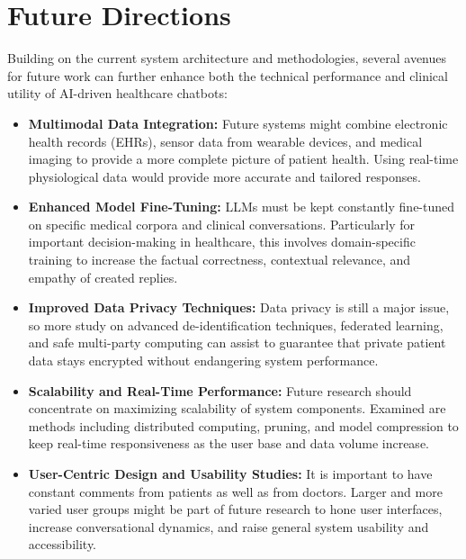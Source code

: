 \section{Future Directions}
\label{sec:future_directions}

Building on the current system architecture and methodologies, several avenues for future work can further enhance both the technical performance and clinical utility of AI-driven healthcare chatbots:

\begin{itemize}[itemsep=2em]
    \item \textbf{Multimodal Data Integration:}  
          Future systems might combine electronic health records (EHRs), sensor data from wearable devices, and medical imaging to provide a more complete picture of patient health. Using real-time physiological data would provide more accurate and tailored responses.
          
    \item \textbf{Enhanced Model Fine-Tuning:}  
          LLMs must be kept constantly fine-tuned on specific medical corpora and clinical conversations. Particularly for important decision-making in healthcare, this involves domain-specific training to increase the factual correctness, contextual relevance, and empathy of created replies.
          
    \item \textbf{Improved Data Privacy Techniques:}  
          Data privacy is still a major issue, so more study on advanced de-identification techniques, federated learning, and safe multi-party computing can assist to guarantee that private patient data stays encrypted without endangering system performance.
          
    \item \textbf{Scalability and Real-Time Performance:}  
          Future research should concentrate on maximizing scalability of system components.  Examined are methods including distributed computing, pruning, and model compression to keep real-time responsiveness as the user base and data volume increase.
          
    \item \textbf{User-Centric Design and Usability Studies:}  
          It is important to have constant comments from patients as well as from doctors. Larger and more varied user groups might be part of future research to hone user interfaces, increase conversational dynamics, and raise general system usability and accessibility.
          

\end{itemize}
